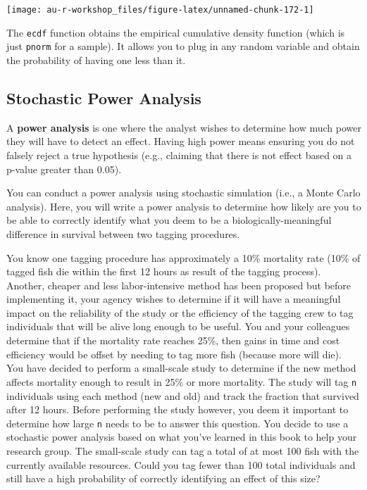 \documentclass[]{book}
\theoremstyle{definition}
\theoremstyle{definition}
\theoremstyle{definition}
\theoremstyle{remark}
\begin{document}
\begin{center}\texttt{[image: au-r-workshop\_files/figure-latex/unnamed-chunk-172-1]} \end{center}

The \texttt{ecdf} function obtains the empirical cumulative density
function (which is just \texttt{pnorm} for a sample). It allows you to
plug in any random variable and obtain the probability of having one
less than it.

\subsection{Stochastic Power Analysis}\label{power-ex}

A \textbf{power analysis} is one where the analyst wishes to determine
how much power they will have to detect an effect. Having high power
means ensuring you do not falsely reject a true hypothesis (e.g.,
claiming that there is not effect based on a p-value greater than 0.05).

You can conduct a power analysis using stochastic simulation (i.e., a
Monte Carlo analysis). Here, you will write a power analysis to
determine how likely are you to be able to correctly identify what you
deem to be a biologically-meaningful difference in survival between two
tagging procedures.

You know one tagging procedure has approximately a 10\% mortality rate
(10\% of tagged fish die within the first 12 hours as result of the
tagging process). Another, cheaper and less labor-intensive method has
been proposed but before implementing it, your agency wishes to
determine if it will have a meaningful impact on the reliability of the
study or the efficiency of the tagging crew to tag individuals that will
be alive long enough to be useful. You and your colleagues determine
that if the mortality rate reaches 25\%, then gains in time and cost
efficiency would be offset by needing to tag more fish (because more
will die). You have decided to perform a small-scale study to determine
if the new method affects mortality enough to result in 25\% or more
mortality. The study will tag \texttt{n} individuals using each method
(new and old) and track the fraction that survived after 12 hours.
Before performing the study however, you deem it important to determine
how large \texttt{n} needs to be to answer this question. You decide to
use a stochastic power analysis based on what you've learned in this
book to help your research group. The small-scale study can tag a total
of at most 100 fish with the currently available resources. Could you
tag fewer than 100 total individuals and still have a high probability
of correctly identifying an effect of this size?
\end{document}
